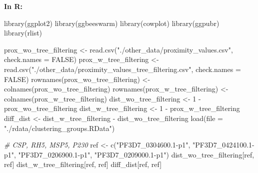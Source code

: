 \documentclass[
  11pt,
  oneside]{book}
\newenvironment{Shaded}{\begin{snugshade}}{\end{snugshade}}
\newcommand{\AttributeTok}[1]{\textcolor[rgb]{0.77,0.63,0.00}{#1}}
\newcommand{\CommentTok}[1]{\textcolor[rgb]{0.56,0.35,0.01}{\textit{#1}}}
\newcommand{\ConstantTok}[1]{\textcolor[rgb]{0.00,0.00,0.00}{#1}}
\newcommand{\DecValTok}[1]{\textcolor[rgb]{0.00,0.00,0.81}{#1}}
\newcommand{\FunctionTok}[1]{\textcolor[rgb]{0.00,0.00,0.00}{#1}}
\newcommand{\NormalTok}[1]{#1}
\newcommand{\OtherTok}[1]{\textcolor[rgb]{0.56,0.35,0.01}{#1}}
\newcommand{\SpecialCharTok}[1]{\textcolor[rgb]{0.00,0.00,0.00}{#1}}
\newcommand{\StringTok}[1]{\textcolor[rgb]{0.31,0.60,0.02}{#1}}
\begin{document}
\textbf{In R: }

\begin{Shaded}
\begin{Highlighting}[]
\FunctionTok{library}\NormalTok{(ggplot2)}
\FunctionTok{library}\NormalTok{(ggbeeswarm)}
\FunctionTok{library}\NormalTok{(cowplot)}
\FunctionTok{library}\NormalTok{(ggpubr)}
\FunctionTok{library}\NormalTok{(rlist)}
\end{Highlighting}
\end{Shaded}

\begin{Shaded}
\begin{Highlighting}[]
\NormalTok{prox\_wo\_tree\_filtering }\OtherTok{\textless{}{-}} \FunctionTok{read.csv}\NormalTok{(}\StringTok{"./other\_data/proximity\_values.csv"}\NormalTok{, }\AttributeTok{check.names =} \ConstantTok{FALSE}\NormalTok{)}
\NormalTok{prox\_w\_tree\_filtering }\OtherTok{\textless{}{-}} \FunctionTok{read.csv}\NormalTok{(}\StringTok{"./other\_data/proximity\_values\_tree\_filtering.csv"}\NormalTok{, }\AttributeTok{check.names =} \ConstantTok{FALSE}\NormalTok{)}
\FunctionTok{rownames}\NormalTok{(prox\_wo\_tree\_filtering) }\OtherTok{\textless{}{-}} \FunctionTok{colnames}\NormalTok{(prox\_wo\_tree\_filtering)}
\FunctionTok{rownames}\NormalTok{(prox\_w\_tree\_filtering) }\OtherTok{\textless{}{-}} \FunctionTok{colnames}\NormalTok{(prox\_w\_tree\_filtering)}
\NormalTok{dist\_wo\_tree\_filtering }\OtherTok{\textless{}{-}} \DecValTok{1} \SpecialCharTok{{-}}\NormalTok{ prox\_wo\_tree\_filtering}
\NormalTok{dist\_w\_tree\_filtering }\OtherTok{\textless{}{-}} \DecValTok{1} \SpecialCharTok{{-}}\NormalTok{ prox\_w\_tree\_filtering}
\NormalTok{diff\_dist }\OtherTok{\textless{}{-}}\NormalTok{ dist\_w\_tree\_filtering }\SpecialCharTok{{-}}\NormalTok{ dist\_wo\_tree\_filtering}
\FunctionTok{load}\NormalTok{(}\AttributeTok{file =} \StringTok{"./rdata/clustering\_groups.RData"}\NormalTok{)}
\end{Highlighting}
\end{Shaded}

\begin{Shaded}
\begin{Highlighting}[]
\CommentTok{\# CSP, RH5, MSP5, P230}
\NormalTok{ref }\OtherTok{\textless{}{-}} \FunctionTok{c}\NormalTok{(}\StringTok{"PF3D7\_0304600.1{-}p1"}\NormalTok{, }\StringTok{"PF3D7\_0424100.1{-}p1"}\NormalTok{, }\StringTok{"PF3D7\_0206900.1{-}p1"}\NormalTok{, }\StringTok{"PF3D7\_0209000.1{-}p1"}\NormalTok{)}
\NormalTok{dist\_wo\_tree\_filtering[ref, ref]}
\NormalTok{dist\_w\_tree\_filtering[ref, ref]}
\NormalTok{diff\_dist[ref, ref]}
\end{Highlighting}
\end{Shaded}
\end{document}
